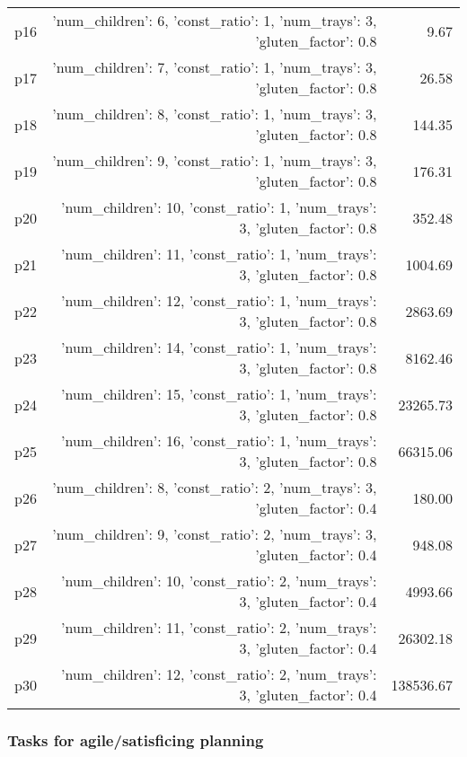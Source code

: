 \documentclass{article}
\begin{document}
\begin{center}
\begin{tabular}{@{}l|r|r@{}}
  p16&{'num\_children': 6, 'const\_ratio': 1, 'num\_trays': 3, 'gluten\_factor': 0.8}&9.67\\
  p17&{'num\_children': 7, 'const\_ratio': 1, 'num\_trays': 3, 'gluten\_factor': 0.8}&26.58\\
  p18&{'num\_children': 8, 'const\_ratio': 1, 'num\_trays': 3, 'gluten\_factor': 0.8}&144.35\\
  p19&{'num\_children': 9, 'const\_ratio': 1, 'num\_trays': 3, 'gluten\_factor': 0.8}&176.31\\
  p20&{'num\_children': 10, 'const\_ratio': 1, 'num\_trays': 3, 'gluten\_factor': 0.8}&352.48\\
  p21&{'num\_children': 11, 'const\_ratio': 1, 'num\_trays': 3, 'gluten\_factor': 0.8}&1004.69\\
  p22&{'num\_children': 12, 'const\_ratio': 1, 'num\_trays': 3, 'gluten\_factor': 0.8}&2863.69\\
  p23&{'num\_children': 14, 'const\_ratio': 1, 'num\_trays': 3, 'gluten\_factor': 0.8}&8162.46\\
  p24&{'num\_children': 15, 'const\_ratio': 1, 'num\_trays': 3, 'gluten\_factor': 0.8}&23265.73\\
  p25&{'num\_children': 16, 'const\_ratio': 1, 'num\_trays': 3, 'gluten\_factor': 0.8}&66315.06\\
  p26&{'num\_children': 8, 'const\_ratio': 2, 'num\_trays': 3, 'gluten\_factor': 0.4}&180.00\\
  p27&{'num\_children': 9, 'const\_ratio': 2, 'num\_trays': 3, 'gluten\_factor': 0.4}&948.08\\
  p28&{'num\_children': 10, 'const\_ratio': 2, 'num\_trays': 3, 'gluten\_factor': 0.4}&4993.66\\
  p29&{'num\_children': 11, 'const\_ratio': 2, 'num\_trays': 3, 'gluten\_factor': 0.4}&26302.18\\
  p30&{'num\_children': 12, 'const\_ratio': 2, 'num\_trays': 3, 'gluten\_factor': 0.4}&138536.67
                            \end{tabular}
                            \end{center}
                    

                                \subsubsection*{Tasks for agile/satisficing planning}
                                
\end{document}

